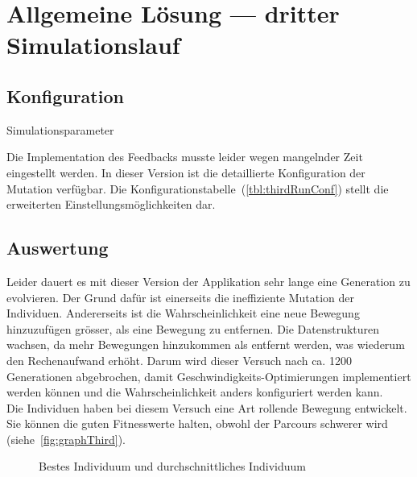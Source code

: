   \section{Allgemeine Lösung --- dritter Simulationslauf}

    \subsection{Konfiguration}

      \begin{table}[H]
        \centering
        
        \caption{Simulationsparameter\label{tbl:thirdRunConf}}
      \end{table}

      Die Implementation des Feedbacks musste leider wegen mangelnder Zeit eingestellt werden.
      In dieser Version ist die detaillierte Konfiguration der Mutation verfügbar.
      Die Konfigurationstabelle~(\vref{tbl:thirdRunConf}) stellt die erweiterten Einstellungsmöglichkeiten dar.

    \subsection{Auswertung\label{sub:thirdAuswertung}}

      Leider dauert es mit dieser Version der Applikation sehr lange eine Generation zu evolvieren.
      Der Grund dafür ist einerseits die ineffiziente Mutation der Individuen.
      Andererseits ist die Wahrscheinlichkeit eine neue Bewegung hinzuzufügen grösser, als eine Bewegung zu entfernen.
      Die Datenstrukturen wachsen, da mehr Bewegungen hinzukommen als entfernt werden,
      was wiederum den Rechenaufwand erhöht.
      Darum wird dieser Versuch nach ca. 1200 Generationen abgebrochen,
      damit Geschwindigkeits-Optimierungen implementiert werden können und
      die Wahrscheinlichkeit anders konfiguriert werden kann.
      \\
      Die Individuen haben bei diesem Versuch eine Art rollende Bewegung entwickelt.
      Sie können die guten Fitnesswerte halten,
      obwohl der Parcours schwerer wird (siehe~\vref{fig:graphThird}).

      \begin{figure}[H]
        \centering
        
        \caption{Bestes Individuum und durchschnittliches Individuum\label{fig:graphThird}}
      \end{figure}

